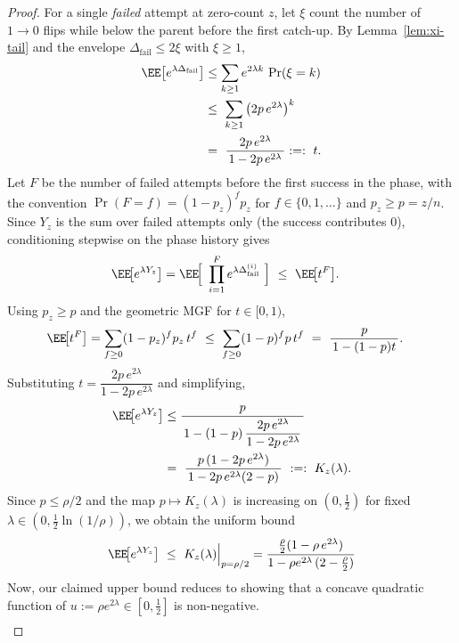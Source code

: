 \begin{proof}
	For a single \emph{failed} attempt at zero-count $z$, let $\xi$ count the number of $1\!\to 0$ flips while below the parent before the first catch-up.
	By Lemma~\ref{lem:xi-tail} and the envelope $\Delta_{\mathrm{fail}}\le 2\xi$ with $\xi\ge 1$,
	\begin{align*}
		\EE\!\left[e^{\lambda \Delta_{\mathrm{fail}}}\right]
		&\le \sum_{k\ge 1} e^{2\lambda k}\,\Pr(\xi=k)
		\\ &\le\ \sum_{k\ge 1} \big(2p\,e^{2\lambda}\big)^{k}
		\\ &=\ \frac{2p\,e^{2\lambda}}{\,1-2p\,e^{2\lambda}\,}:=:\ t.
	\end{align*}
	Let $F$ be the number of failed attempts before the first success in the phase, with the convention
	$\Pr(F=f)=(1-p_z)^f p_z$ for $f\in\{0,1,\ldots\}$ and $p_z\ge p=z/n$.
	Since $Y_z$ is the sum over failed attempts only (the success contributes $0$), conditioning stepwise on the phase history gives
	\begin{align*}
		\EE\!\big[e^{\lambda Y_z}\big]
		&=\EE\!\Big[\ \prod_{i=1}^{F} e^{\lambda \Delta_{\mathrm{fail}}^{(i)}}\ \Big]
		\ \le\ \EE\!\big[t^{F}\big].
	\end{align*}
	Using $p_z\ge p$ and the geometric MGF for $t\in[0,1)$,
	\begin{align*}
		\EE\!\big[t^{F}\big]
		&= \sum_{f\ge 0} (1-p_z)^f p_z\, t^f
		\ \le\ \sum_{f\ge 0} (1-p)^f p\, t^f
		\ =\ \frac{p}{\,1-(1-p)t\,}.
	\end{align*}
	Substituting $t=\dfrac{2p\,e^{2\lambda}}{1-2p\,e^{2\lambda}}$ and simplifying,
	\begin{align*}
		\EE\!\big[e^{\lambda Y_z}\big]
		&\le \frac{p}{\,1-(1-p)\,\dfrac{2p\,e^{2\lambda}}{1-2p\,e^{2\lambda}}\,}
		\\ &=\ \frac{p\,(1-2p\,e^{2\lambda})}{\,1-2p\,e^{2\lambda}(2-p)\,}
		\ :=:\ K_z(\lambda).
	\end{align*}
	Since $p\le \rho/2$ and the map $p\mapsto K_z(\lambda)$ is increasing on $(0,\tfrac12)$ for fixed $\lambda\in(0,\tfrac12\ln(1/\rho))$, we obtain the uniform bound
	\begin{align*}
		\EE\!\big[e^{\lambda Y_z}\big]
		\ \le\ K_z(\lambda)\Big|_{p=\rho/2}=\frac{\tfrac{\rho}{2}(1-\rho\,e^{2\lambda})}{1-\rho e^{2\lambda}\,(2-\tfrac{\rho}{2})}
	\end{align*}
	Now, our claimed upper bound reduces to showing that a concave quadratic function of $u:=\rho e^{2\lambda} \in \left[0,\frac{1}{2}\right]$ is non-negative.
	\begin{align*}

\end{align*}
\end{proof}

